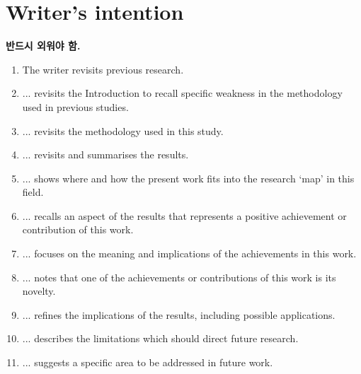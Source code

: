 \documentclass[10pt]{report}
\begin{document}
	\section{Writer's intention}
	\textbf{반드시 외워야 함.}
	\begin{enumerate}
		\item The writer revisits previous research.
		\item ... revisits the Introduction to recall specific weakness in the methodology used in previous studies.
		\item ... revisits the methodology used in this study.
		\item ... revisits and summarises the results.
		\item ... shows where and how the present work fits into the research `map' in this field.
		\item ... recalls an aspect of the results that represents a positive achievement or contribution of this work.
		\item ... focuses on the meaning and implications of the achievements in this work.
		\item ... notes that one of the achievements or contributions of this work is its novelty.
		\item ... refines the implications of the results, including possible applications.
		\item ... describes the limitations which should direct future research.
		\item ... suggests a specific area to be addressed in future work.
	\end{enumerate}
	
\end{document}
